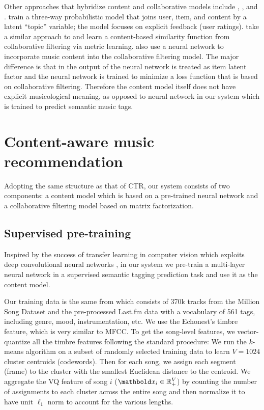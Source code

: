Other approaches that hybridize content and collaborative models include \citet{yoshii2006hybrid}, \citet{mcfee2010learning}, and \citet{wang2014improving}. \citet{yoshii2006hybrid} train a three-way probabilistic model that joins user, item, and content by a latent ``topic'' variable; the model focuses on explicit feedback (user ratings). \cite{mcfee2010learning} take a similar approach to \cite{van2013deep} and learn a content-based similarity function from collaborative filtering via metric learning. \cite{wang2014improving} also use a neural network to incorporate music content into the collaborative filtering model. The major difference is that in \cite{wang2014improving} the output of the neural network is treated as item latent factor and the neural network is trained to minimize a loss function that is based on collaborative filtering. Therefore the content model itself does not have explicit musicological meaning, as opposed to neural network in our system which is trained to predict semantic music tags. 


\section{Content-aware music recommendation} 
Adopting the same structure as that of CTR, our system consists of two components: a content model which is based on a pre-trained neural network and a collaborative filtering model based on matrix factorization. 

\subsection{Supervised pre-training} \label{chpt:content:sec:nnet}

Inspired by the success of transfer learning in computer vision which exploits deep convolutional neural networks \citep{krizhevsky2012imagenet}, in our system we pre-train a multi-layer neural network in a supervised semantic tagging prediction task and use it as the content model. 

Our training data is the same from  which consists of 370k tracks from the Million Song Dataset and the pre-processed Last.fm data with a vocabulary of 561 tags, including genre, mood, instrumentation, etc. We use the Echonest's timbre feature, which is very similar to MFCC. To get the song-level features, we vector-quantize all the timbre features following the standard procedure: We run the $k$-means algorithm on a subset of randomly selected training data to learn $V = 1024$ cluster centroids (codewords). Then for each song, we assign each segment (frame) to the cluster with the smallest Euclidean distance to the centroid. We aggregate the VQ feature of song $i$ ($\mb{x}_i \in \mathbb{R}_+^{V}$) by counting the number of assignments to each cluster across the entire song and then normalize it to have unit $\ell_1$ norm to account for the various lengths.

